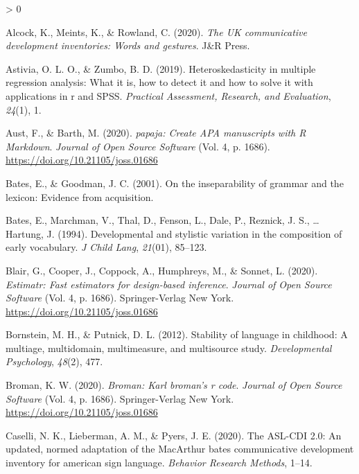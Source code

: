 \documentclass[
  english,
  ,man,floatsintext]{apa6}
\newlength{\cslhangindent}
\newenvironment{CSLReferences}[2] %
 {%
  \setlength{\parindent}{0pt}
  \ifodd #1 \everypar{\setlength{\hangindent}{\cslhangindent}}\ignorespaces\fi
  \ifnum #2 > 0
  \setlength{\parskip}{#2\baselineskip}
  \fi
 }%
 {}
\begin{document}
\hypertarget{refs}{}
\begin{CSLReferences}{1}{0}
\leavevmode\hypertarget{ref-Alcock2020}{}%
Alcock, K., Meints, K., \& Rowland, C. (2020). \emph{The UK communicative development inventories: Words and gestures}. J\&R Press.

\leavevmode\hypertarget{ref-Astivia2019}{}%
Astivia, O. L. O., \& Zumbo, B. D. (2019). Heteroskedasticity in multiple regression analysis: What it is, how to detect it and how to solve it with applications in r and SPSS. \emph{Practical Assessment, Research, and Evaluation}, \emph{24}(1), 1.

\leavevmode\hypertarget{ref-R-papaja}{}%
Aust, F., \& Barth, M. (2020). \emph{{papaja}: {Create} {APA} manuscripts with {R Markdown}}. \emph{Journal of Open Source Software} (Vol. 4, p. 1686). \url{https://doi.org/10.21105/joss.01686}

\leavevmode\hypertarget{ref-Bates2001}{}%
Bates, E., \& Goodman, J. C. (2001). On the inseparability of grammar and the lexicon: Evidence from acquisition.

\leavevmode\hypertarget{ref-bates1994}{}%
Bates, E., Marchman, V., Thal, D., Fenson, L., Dale, P., Reznick, J. S., \ldots{} Hartung, J. (1994). Developmental and stylistic variation in the composition of early vocabulary. \emph{J Child Lang}, \emph{21}(01), 85--123.

\leavevmode\hypertarget{ref-R-estimatr}{}%
Blair, G., Cooper, J., Coppock, A., Humphreys, M., \& Sonnet, L. (2020). \emph{Estimatr: Fast estimators for design-based inference}. \emph{Journal of Open Source Software} (Vol. 4, p. 1686). Springer-Verlag New York. \url{https://doi.org/10.21105/joss.01686}

\leavevmode\hypertarget{ref-bornstein2012}{}%
Bornstein, M. H., \& Putnick, D. L. (2012). Stability of language in childhood: A multiage, multidomain, multimeasure, and multisource study. \emph{Developmental Psychology}, \emph{48}(2), 477.

\leavevmode\hypertarget{ref-R-broman}{}%
Broman, K. W. (2020). \emph{Broman: Karl broman's r code}. \emph{Journal of Open Source Software} (Vol. 4, p. 1686). Springer-Verlag New York. \url{https://doi.org/10.21105/joss.01686}

\leavevmode\hypertarget{ref-Caselli2020}{}%
Caselli, N. K., Lieberman, A. M., \& Pyers, J. E. (2020). The ASL-CDI 2.0: An updated, normed adaptation of the MacArthur bates communicative development inventory for american sign language. \emph{Behavior Research Methods}, 1--14.


\end{CSLReferences}
\end{document}
